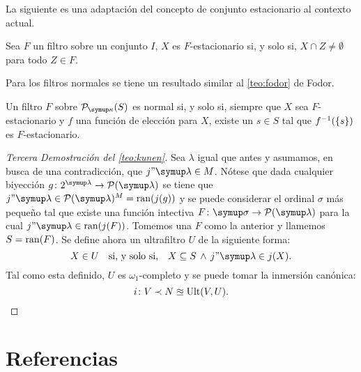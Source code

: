 La siguiente es una adaptación del concepto de conjunto estacionario al
contexto actual.

\begin{defi}
    Sea $F$ un filtro sobre un conjunto $I$, $X$ es $F$-estacionario si, y solo si,
    $X\cap Z\neq\emptyset$ para todo $Z\in F$.
\end{defi}

Para los filtros normales se tiene un resultado similar al \cref{teo:fodor} de Fodor.

\begin{teo}
    Un filtro $F$ sobre $\pwset[\kappa]{S}$ es normal si, y solo si,
    siempre que $X$ sea $F$-estacionario y $f$ una función de elección para $X$,
    existe un $s\in S$ tal que $f^{-1}(\left\{ s \right\})$ es $F$-estacionario.
\end{teo}

\begin{proof}[Tercera Demostración del \cref{teo:kunen}]
    Sea $\lambda$ igual que antes y asumamos, en busca de una contradicción, que $j"\lambda\in M$.
    Nótese que dada cualquier biyección $g\colon 2^\lambda\to\pwset{\lambda}$ se tiene que
    $j"\lambda\in\pwset{\lambda}^M = \ran(j(g))$ y se puede considerar el ordinal $\sigma$ más
    pequeño tal que existe una función intectiva $F\colon\sigma\to\pwset{\lambda}$ para la cual
    $j"\lambda\in \ran(j(F))$. Tomemos una $F$ como la anterior y llamemos $S=\operatorname{ran}(F)$.
    Se define ahora un ultrafiltro $U$ de la siguiente forma:
    \[
        X\in U\quad\text{si, y solo si,}\quad X\subseteq S \,\land\, j"\lambda\in j(X).
    \]
    Tal como esta definido, $U$ es $\omega_1$-completo y se puede tomar la inmersión canónica:
    \[
        i\colon V\prec N\approxeq\operatorname{Ult}(V, U).
    \]
\end{proof}
\fi
\backmatter
\ifreferencias
\chapter*{Referencias}
\printbibliography[heading=mybib]
\fi

